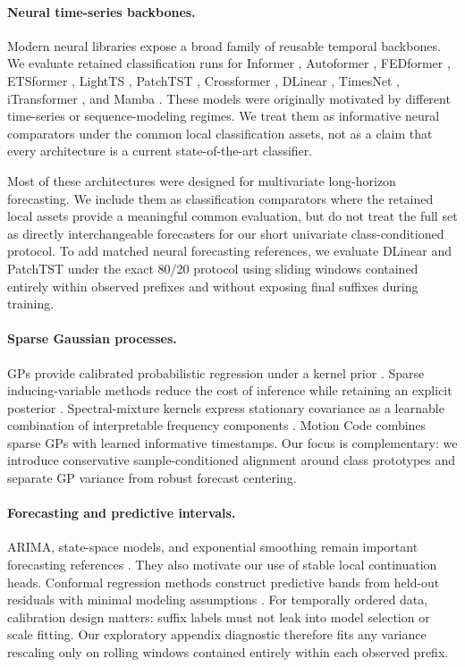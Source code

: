 \documentclass[11pt]{article}
\newcommand{\mc}{Motion Code}
\begin{document}
\paragraph{Neural time-series backbones.}
Modern neural libraries expose a broad family of reusable temporal backbones. We evaluate retained classification runs for Informer \citep{zhou2021informer}, Autoformer \citep{wu2021autoformer}, FEDformer \citep{zhou2022fedformer}, ETSformer \citep{woo2022etsformer}, LightTS \citep{zhang2022lightts}, PatchTST \citep{nie2022patchtst}, Crossformer \citep{zhang2023crossformer}, DLinear \citep{zeng2023dlinear}, TimesNet \citep{wu2023timesnet}, iTransformer \citep{liu2024itransformer}, and Mamba \citep{gu2023mamba}. These models were originally motivated by different time-series or sequence-modeling regimes. We treat them as informative neural comparators under the common local classification assets, not as a claim that every architecture is a current state-of-the-art classifier.

Most of these architectures were designed for multivariate long-horizon forecasting. We include them as classification comparators where the retained local assets provide a meaningful common evaluation, but do not treat the full set as directly interchangeable forecasters for our short univariate class-conditioned protocol. To add matched neural forecasting references, we evaluate DLinear and PatchTST under the exact 80/20 protocol using sliding windows contained entirely within observed prefixes and without exposing final suffixes during training.

\paragraph{Sparse Gaussian processes.}
GPs provide calibrated probabilistic regression under a kernel prior \citep{rasmussen2006gaussian}. Sparse inducing-variable methods reduce the cost of inference while retaining an explicit posterior \citep{titsias2009variational}. Spectral-mixture kernels express stationary covariance as a learnable combination of interpretable frequency components \citep{wilson2013kernels}. \mc{} combines sparse GPs with learned informative timestamps. Our focus is complementary: we introduce conservative sample-conditioned alignment around class prototypes and separate GP variance from robust forecast centering.

\paragraph{Forecasting and predictive intervals.}
ARIMA, state-space models, and exponential smoothing remain important forecasting references \citep{box2015timeseries,harvey1990forecasting,delivera2011forecasting}. They also motivate our use of stable local continuation heads. Conformal regression methods construct predictive bands from held-out residuals with minimal modeling assumptions \citep{lei2018distribution}. For temporally ordered data, calibration design matters: suffix labels must not leak into model selection or scale fitting. Our exploratory appendix diagnostic therefore fits any variance rescaling only on rolling windows contained entirely within each observed prefix.
\end{document}
